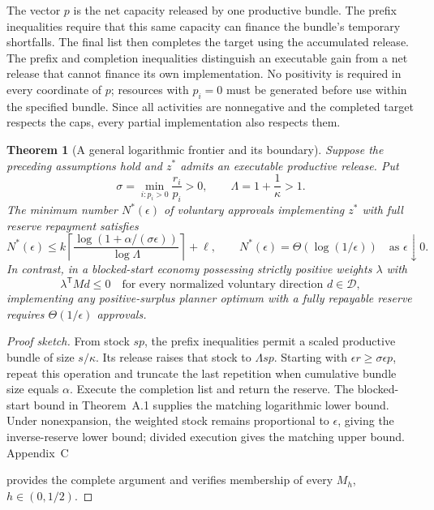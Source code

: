 \documentclass[ecta,draft]{econsocart}
\newtheorem{theorem}{Theorem}
\theoremstyle{definition}
\theoremstyle{definition}
\begin{document}
The vector $p$ is the net capacity released by one productive bundle.
The prefix inequalities require that this same capacity can finance the
bundle's temporary shortfalls. The final list then completes the target
using the accumulated release. The prefix and completion inequalities distinguish an executable gain
from a net release that cannot finance its own implementation. No
positivity is required in every coordinate of $p$; resources with
$p_i=0$ must be generated before use within the specified bundle.
Since all activities are nonnegative and the completed target respects
the caps, every partial implementation also respects them.

\begin{theorem}[A general logarithmic frontier and its boundary]
\label{thm:generalproductive}
Suppose the preceding assumptions hold and $z^*$ admits an executable
productive release. Put
\[
 \sigma=\min_{i:p_i>0}\frac{r_i}{p_i}>0,
 \qquad \Lambda=1+\frac1\kappa>1.
\]
The minimum number $N^*(\epsilon)$ of voluntary approvals implementing
$z^*$ with full reserve repayment satisfies
\[
 N^*(\epsilon)
 \leq k\left\lceil
 \frac{\log(1+\alpha/(\sigma\epsilon))}{\log\Lambda}
 \right\rceil+\ell,
 \qquad
 N^*(\epsilon)=\Theta(\log(1/\epsilon))
 \quad\text{as }\epsilon\downarrow0.
\]
In contrast, in a blocked-start economy possessing strictly positive
weights $\lambda$ with
\[
 \lambda^{\mathsf T}Md\leq0
 \quad\text{for every normalized voluntary direction }d\in\mathcal D,
\]
implementing any positive-surplus planner optimum with a fully repayable
reserve requires $\Theta(1/\epsilon)$ approvals.
\end{theorem}

\begin{proof}[Proof sketch]
From stock $s p$, the prefix inequalities permit a scaled productive
bundle of size $s/\kappa$. Its release raises that stock to
$\Lambda s p$. Starting with $\epsilon r\geq\sigma\epsilon p$,
repeat this operation and truncate the last repetition when cumulative
bundle size equals $\alpha$. Execute the completion list and return the
reserve. The blocked-start bound in
Theorem~A.1%
 supplies the matching logarithmic
lower bound. Under nonexpansion, the weighted stock remains proportional
to $\epsilon$, giving the inverse-reserve lower bound; divided execution
gives the matching upper bound. Appendix~C%

provides the complete argument and verifies membership of every
$M_h$, $h\in(0,1/2)$.
\end{proof}
\end{document}
